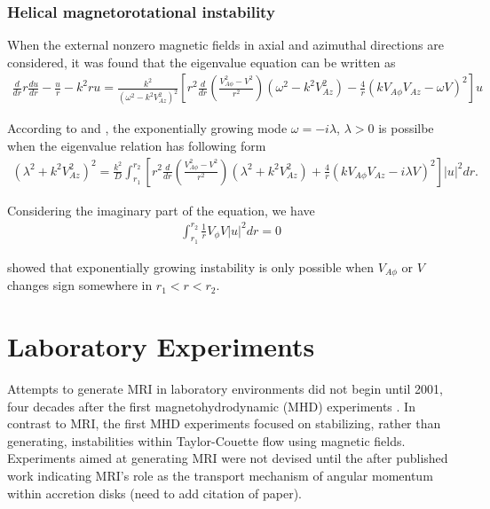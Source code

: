\documentclass{jfm}
\begin{document}
\subsubsection{Helical magnetorotational instability}

When the external nonzero magnetic fields in axial and azimuthal directions are
considered, it was found that the eigenvalue equation can be written as
\begin{align}
    \frac{d}{dr}r\frac{du}{dr}-\frac{u}{r}-k^2ru = \frac{k^2}{(\omega^2-k^2 V_{Az}^2)^2}\left[r^2 \frac{d}{dr}\left(\frac{V_{A\phi}^2-V^2}{r^2}\right)
    (\omega^2-k^2V_{Az}^2) 
    -\frac{4}{r}(kV_{A\phi}V_{Az}-\omega V)^2\right]u
\end{align}

According to \cite{Knobloch1992} and \cite{Julien2010}, the exponentially 
growing mode $\omega =-i\lambda$, $\lambda>0$ is possilbe when the eigenvalue 
relation has following form
\begin{align}
    (\lambda^2 +k^2 V_{Az}^2)^2 = \frac{k^2}{D}\int_{r_1}^{r_2} \left[ r^2 \frac{d}{dr}\left( \frac{V_{A\phi}^2-V^2}{r^2}\right)(\lambda^2+k^2 V_{Az}^2) + \frac{4}{r}(k V_{A\phi} V_{Az}-i\lambda V)^2 \right]|u|^2 dr.
\end{align}

Considering the imaginary part of the equation, we have 
\begin{align}
    \int_{r_1}^{r_2} \frac{1}{r}V_\phi V |u|^2 dr =0
\end{align}

\cite{Knobloch1992} showed that exponentially growing instability is only possible 
when $V_{A\phi}$ or $V$ changes sign somewhere in $r_1< r < r_2$.



\section{Laboratory Experiments}
\label{sec:experiments}

Attempts to generate MRI in laboratory environments did not begin until 2001,
four decades after the first magnetohydrodynamic (MHD) experiments 
\citep[see][]{Donnelly1960}. In contrast to MRI, the first MHD experiments 
focused on stabilizing, rather than generating, instabilities within 
Taylor-Couette flow using magnetic fields. Experiments aimed at generating MRI
were not devised until the after published work indicating MRI's role as the
transport mechanism of angular momentum within accretion disks (need to add citation of paper).
\end{document}

